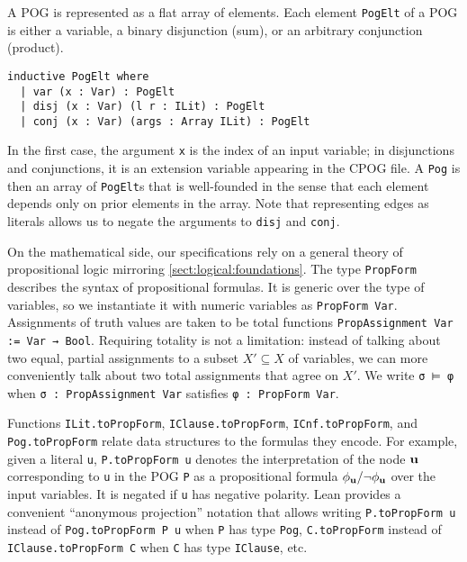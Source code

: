 A POG is represented as a flat array of elements.
Each element {\tt PogElt} of a POG is either a variable,
a binary disjunction (sum),
or an arbitrary conjunction (product).
\begin{lstlisting}
inductive PogElt where
  | var (x : Var) : PogElt
  | disj (x : Var) (l r : ILit) : PogElt
  | conj (x : Var) (args : Array ILit) : PogElt
\end{lstlisting}
In the first case,
the argument \lstinline{x} is the index of an input variable;
in disjunctions and conjunctions,
it is an extension variable appearing in the CPOG file.
A \lstinline{Pog} is then an array of \lstinline{PogElt}s that is well-founded
in the sense that each element depends only on prior elements in the array.
Note that representing edges as literals
allows us to negate the arguments to \lstinline{disj} and \lstinline{conj}.

On the mathematical side,
our specifications rely on a general theory of propositional logic
mirroring \ref{sect:logical:foundations}.
The type \lstinline{PropForm} describes the syntax of propositional formulas.
It is generic over the type of variables,
so we instantiate it with numeric variables as \lstinline{PropForm Var}.
Assignments of truth values are taken to be total functions \lstinline{PropAssignment Var := Var → Bool}.
Requiring totality is not a limitation:
instead of talking about two equal,
partial assignments to a subset $X' \subseteq X$ of variables,
we can more conveniently talk about two total assignments that agree on $X'$.
We write \lstinline{σ ⊨ φ} when \lstinline{σ : PropAssignment Var} satisfies \lstinline{φ : PropForm Var}.

Functions \lstinline{ILit.toPropForm},
\lstinline{IClause.toPropForm},
\lstinline{ICnf.toPropForm},
and \lstinline{Pog.toPropForm}
relate data structures to the formulas they encode.
For example, given a literal \lstinline{u},
\lstinline{P.toPropForm u} denotes the interpretation
of the node $\mathbf{u}$ corresponding to \lstinline{u} in the POG \lstinline{P}
as a propositional formula $\phi_{\mathbf{u}}/\neg\phi_{\mathbf{u}}$
over the input variables.
It is negated if \lstinline{u} has negative polarity.
Lean provides a convenient ``anonymous projection'' notation
that allows writing \lstinline{P.toPropForm u} instead of \lstinline{Pog.toPropForm P u}
when \lstinline{P} has type \lstinline{Pog},
\lstinline{C.toPropForm} instead of \lstinline{IClause.toPropForm C}
when \lstinline{C} has type \lstinline{IClause},
etc.


